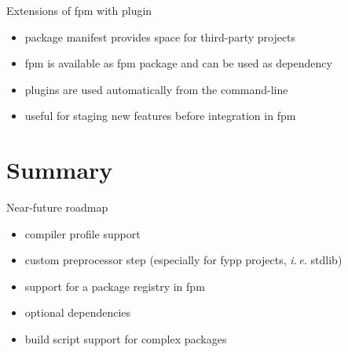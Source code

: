 \documentclass[lualatex,10pt,aspectratio=169]{beamer}
\begin{document}
\begin{frame}{Extensions of fpm with plugin}
   \begin{itemize}
      \item package manifest provides space for third-party projects
      \item fpm is available as fpm package and can be used as dependency
      \item plugins are used automatically from the command-line
      \item useful for staging new features before integration in fpm
   \end{itemize}
   \vfill

\end{frame}


\section{Summary}

\begin{frame}{Near-future roadmap}
   \begin{itemize}
      \item compiler profile support
      \item custom preprocessor step (especially for fypp projects, \textit{i.\,e.} stdlib)
      \item support for a package registry in fpm
      \item optional dependencies
      \item build script support for complex packages
   \end{itemize}
\end{frame}
\end{document}
